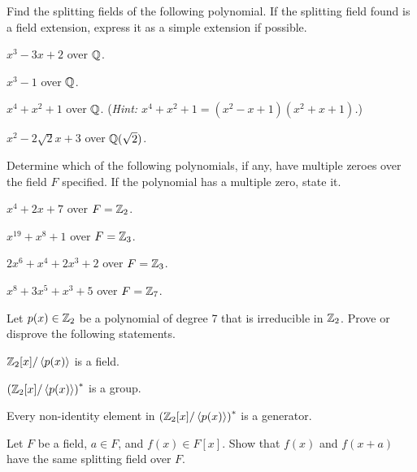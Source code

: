 \begin{problem}
    Find the splitting fields of the following polynomial. If the splitting field found is a field extension, express it as a simple extension if possible.
    \begin{partquestions}{\alph*}
        \item $x^3 - 3x + 2$ over $\mathbb{Q}$.
        \item $x^3 - 1$ over $\mathbb{Q}$.
        \item $x^4 + x^2 + 1$ over $\mathbb{Q}$.\newline
        (\textit{Hint: $x^4+x^2+1 = (x^2-x+1)(x^2+x+1)$.})
        \item $x^2 - 2\sqrt{2}x + 3$ over $\mathbb{Q}(\sqrt2)$.
    \end{partquestions}
\end{problem}

\begin{problem}
    Determine which of the following polynomials, if any, have multiple zeroes over the field $F$ specified. If the polynomial has a multiple zero, state it.
    \begin{partquestions}{\alph*}
        \item $x^4 + 2x + 7$ over $F = \mathbb{Z}_2$.
        \item $x^{19} + x^8 + 1$ over $F = \mathbb{Z}_3$.
        \item $2x^6 + x^4 + 2x^3 + 2$ over $F = \mathbb{Z}_3$.
        \item $x^8 + 3x^5 + x^3 + 5$ over $F = \mathbb{Z}_7$.
    \end{partquestions}
\end{problem}

\begin{problem}
    Let $p(x) \in \mathbb{Z}_2$ be a polynomial of degree 7 that is irreducible in $\mathbb{Z}_2$. Prove or disprove the following statements.
    \begin{partquestions}{\roman*}
        \item $\mathbb{Z}_2[x]/\left\langle p(x)\right\rangle$ is a field.
        \item $\left(\mathbb{Z}_2[x]/\left\langle p(x)\right\rangle\right)^\ast$ is a group.
        \item Every non-identity element in $\left(\mathbb{Z}_2[x]/\left\langle p(x)\right\rangle\right)^\ast$ is a generator.
    \end{partquestions}
\end{problem}

\begin{problem}
    Let $F$ be a field, $a \in F$, and $f(x) \in F[x]$. Show that $f(x)$ and $f(x+a)$ have the same splitting field over $F$.
\end{problem}


